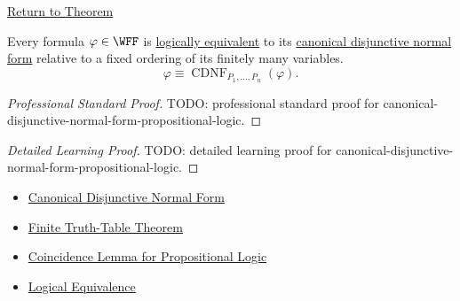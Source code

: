 \newpage
{}
\label{prf:canonical-disjunctive-normal-form-propositional-logic}

\begin{remark*}[Return]
\hyperref[thm:canonical-disjunctive-normal-form-propositional-logic]{Return to Theorem}
\end{remark*}

\begin{theorem*}
Every formula \(\varphi\in\WFF\) is
\hyperref[def:logical-equivalence-propositional-logic]{logically equivalent}
to its
\hyperref[def:canonical-disjunctive-normal-form-propositional-logic]{canonical disjunctive normal form}
relative to a fixed ordering of its finitely many variables.
\[
\varphi\equiv \operatorname{CDNF}_{P_1,\ldots,P_n}(\varphi).
\]
\end{theorem*}

\begin{proof}[Professional Standard Proof]
\LRAProofBodyStart
TODO: professional standard proof for canonical-disjunctive-normal-form-propositional-logic.
\end{proof}

\begin{proof}[Detailed Learning Proof]
\LRAProofBodyStart
TODO: detailed learning proof for canonical-disjunctive-normal-form-propositional-logic.
\end{proof}

\begin{remark*}
\end{remark*}

\begin{dependencies}
\begin{itemize}
  \item \hyperref[def:canonical-disjunctive-normal-form-propositional-logic]{Canonical Disjunctive Normal Form}
  \item \hyperref[thm:finite-truth-table-propositional-logic]{Finite Truth-Table Theorem}
  \item \hyperref[lem:coincidence-lemma-propositional-logic]{Coincidence Lemma for Propositional Logic}
  \item \hyperref[def:logical-equivalence-propositional-logic]{Logical Equivalence}
\end{itemize}
\end{dependencies}

\clearpage
